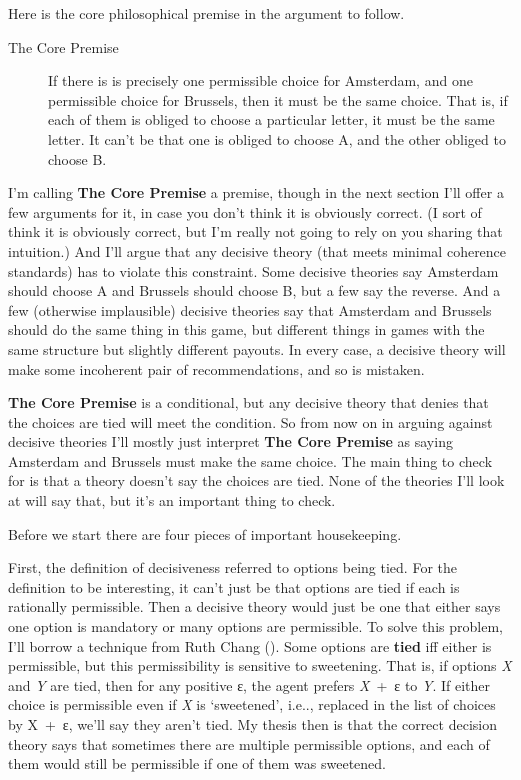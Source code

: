 \documentclass[
  11pt,
  letterpaper,
  DIV=11,
  numbers=noendperiod,
  twoside]{scrartcl}
\begin{document}
Here is the core philosophical premise in the argument to follow.

\begin{description}
\item[The Core Premise]
If there is is precisely one permissible choice for Amsterdam, and one
permissible choice for Brussels, then it must be the same choice. That
is, if each of them is obliged to choose a particular letter, it must be
the same letter. It can't be that one is obliged to choose A, and the
other obliged to choose B.
\end{description}

I'm calling \textbf{The Core Premise} a premise, though in the next
section I'll offer a few arguments for it, in case you don't think it is
obviously correct. (I sort of think it is obviously correct, but I'm
really not going to rely on you sharing that intuition.) And I'll argue
that any decisive theory (that meets minimal coherence standards) has to
violate this constraint. Some decisive theories say Amsterdam should
choose A and Brussels should choose B, but a few say the reverse. And a
few (otherwise implausible) decisive theories say that Amsterdam and
Brussels should do the same thing in this game, but different things in
games with the same structure but slightly different payouts. In every
case, a decisive theory will make some incoherent pair of
recommendations, and so is mistaken.

\textbf{The Core Premise} is a conditional, but any decisive theory that
denies that the choices are tied will meet the condition. So from now on
in arguing against decisive theories I'll mostly just interpret
\textbf{The Core Premise} as saying Amsterdam and Brussels must make the
same choice. The main thing to check for is that a theory doesn't say
the choices are tied. None of the theories I'll look at will say that,
but it's an important thing to check.

Before we start there are four pieces of important housekeeping.

First, the definition of decisiveness referred to options being tied.
For the definition to be interesting, it can't just be that options are
tied if each is rationally permissible. Then a decisive theory would
just be one that either says one option is mandatory or many options are
permissible. To solve this problem, I'll borrow a technique from Ruth
Chang (). Some options are \textbf{tied}
iff either is permissible, but this permissibility is sensitive to
sweetening. That is, if options \emph{X} and \emph{Y} are tied, then for
any positive ε, the agent prefers \emph{X}~+~ε to \emph{Y}. If either
choice is permissible even if \emph{X} is `sweetened', i.e.., replaced
in the list of choices by X~+~ε, we'll say they aren't tied. My thesis
then is that the correct decision theory says that sometimes there are
multiple permissible options, and each of them would still be
permissible if one of them was sweetened.
\end{document}
